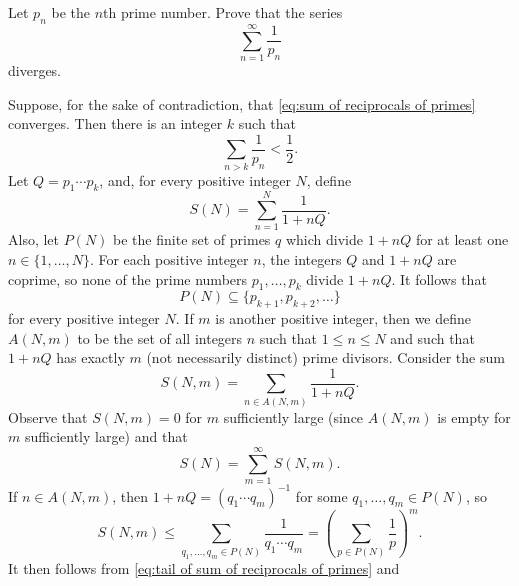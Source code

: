 \documentclass[boxes]{homework}
\begin{document}
\begin{problem}
Let $p_n$ be the $n$th prime number.
Prove that the series
\begin{equation}
	\label{eq:sum of reciprocals of primes}
	\sum_{n=1}^\infty \frac{1}{p_n}
\end{equation}
diverges.
\end{problem}

\begin{solution}
	Suppose, for the sake of contradiction, that
	\eqref{eq:sum of reciprocals of primes} converges.
	Then there is an integer $k$ such that
	\begin{equation}
		\label{eq:tail of sum of reciprocals of primes}
		\sum_{n > k} \frac{1}{p_n} < \frac{1}{2}.
	\end{equation}
	Let $Q = p_1 \cdots p_k$, and, for every positive integer $N$, define
	\begin{equation*}
		S(N) = \sum_{n=1}^N \frac{1}{1 + n Q}.
	\end{equation*}
	Also, let $P(N)$ be the finite set of primes $q$ which divide $1 + n Q$ for at
	least one $n \in \{1,\ldots,N\}$.
	For each positive integer $n$, the integers $Q$ and $1 + n Q$ are coprime, so
	none of the prime numbers $p_1,\ldots,p_k$ divide $1 + n Q$.
	It follows that
	\begin{equation}
		\label{eq:P(N) subset}
		P(N) \subseteq \{p_{k+1}, p_{k+2}, \ldots\}
	\end{equation}
	for every positive integer $N$.
	If $m$ is another positive integer, then we define $A(N, m)$ to be the set of
	all integers $n$ such that $1 \leq n \leq N$ and such that $1 + n Q$ has exactly
	$m$ (not necessarily distinct) prime divisors.
	Consider the sum
	\begin{equation*}
		S(N, m) = \sum_{n \in A(N, m)} \frac{1}{1 + n Q}.
	\end{equation*}
	Observe that $S(N, m) = 0$ for $m$ sufficiently large (since $A(N,m)$ is empty
	for $m$ sufficiently large) and that
	\begin{equation}
		\label{eq:S(N) as sum}
		S(N)
		= \sum_{m=1}^\infty S(N, m).
	\end{equation}
	If $n \in A(N, m)$, then $1 + n Q =  (q_1\cdots q_m)^{-1}$ for some
	$q_1,\ldots,q_m \in P(N)$, so
	\begin{equation*}
		S(N, m)
		\leq \sum_{q_1,\ldots,q_m \in P(N)} \frac{1}{q_1\cdots q_m}
		= \left(\sum_{p \in P(N)} \frac{1}{p}\right)^{m}.
	\end{equation*}
	It then follows from \eqref{eq:tail of sum of reciprocals of primes} and

\end{solution}
\end{document}
